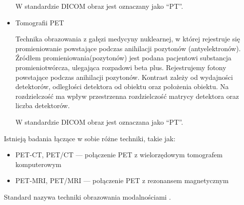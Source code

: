 \begin{itemize}
          W standardzie DICOM obraz jest oznaczany jako \enquote{PT}.

    \item Tomografii PET

          Technika obrazowania  z gałęzi medycyny nuklearnej, w której rejestruje się promieniowanie powstające podczas anihilacji pozytonów (antyelektronów).
          Źródłem promieniowania(pozytonów) jest podana pacjentowi substancja promieniotwórcza, ulegająca rozpadowi beta plus.
          Rejestrujemy fotony powstające podczas anihilacji pozytonów.
          Kontrast zależy od wydajności detektorów, odległości detektora od obiektu oraz położenia obiektu.
          Na rozdzielczość ma wpływ przestrzenna rozdzielczość matrycy detektora oraz liczba detektorów.

          W standardzie DICOM obraz jest oznaczana jako \enquote{PT}.

\end{itemize}

Istnieją badania łączące w sobie różne techniki, takie jak:
\begin{itemize}
    \item PET-CT, PET/CT --- połączenie PET z wielorzędowym tomografem komputerowym
    \item PET-MRI, PET/MRI --- połączenie PET z rezonansem magnetycznym
\end{itemize}

Standard \DICOM nazywa techniki obrazowania modalnościami .